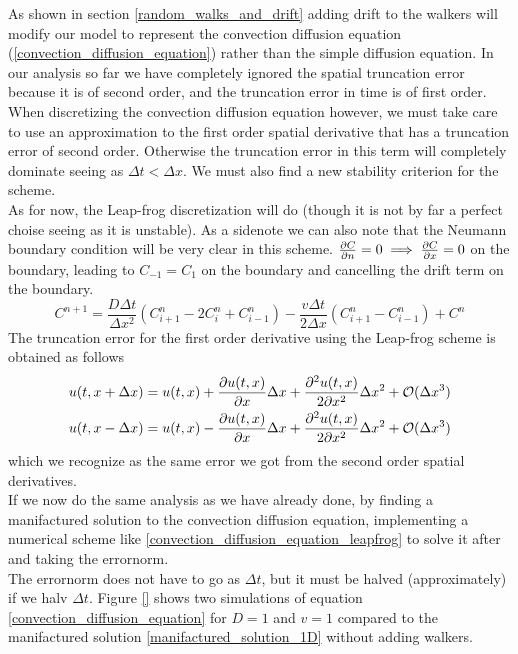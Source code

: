 As shown in section \ref{random_walks_and_drift} adding drift to the walkers will modify our model to represent the convection diffusion equation (\ref{convection_diffusion_equation}) rather than the simple diffusion equation. 
In our analysis so far we have completely ignored the spatial truncation error because it is of second order, and the truncation error in time is of first order. 
When discretizing the convection diffusion equation however, we must take care to use an approximation to the first order spatial derivative that has a truncation error of second order. 
Otherwise the truncation error in this term will completely dominate seeing as $\Delta t<\Delta x$. 
We must also find a new stability criterion for the scheme. \\
As for now, the Leap-frog discretization will do (though it is not by far a perfect choise seeing as it is unstable). 
As a sidenote we can also note that the Neumann boundary condition will be very clear in this scheme. 
$\frac{\partial C}{\partial n} = 0 \implies \frac{\partial C}{\partial x} = 0 $ on the boundary, leading to $C_{-1} = C_{1}$ on the boundary and cancelling the drift term on the boundary.
\begin{equation}\label{convection_diffusion_equation_leapfrog}
 C^{n+1} = \frac{D\Delta t}{\Delta x^2}\left(C^n_{i+1}-2C^n_i+C^n_{i-1}\right)-\frac{v\Delta t}{2\Delta x}\left(C^n_{i+1}-C^n_{i-1}\right) + C^n
\end{equation}
The truncation error for the first order derivative using the Leap-frog scheme is obtained as follows
\begin{align*}
 u(t,x+\Delta x) = u(t,x) + \frac{\partial u(t,x)}{\partial x}\Delta x + \frac{\partial^2u(t,x)}{2\partial x^2}\Delta x^2 +\mathcal{O}(\Delta x^3)\\
 u(t,x-\Delta x) = u(t,x) - \frac{\partial u(t,x)}{\partial x}\Delta x + \frac{\partial^2u(t,x)}{2\partial x^2}\Delta x^2 +\mathcal{O}(\Delta x^3)
\end{align*}
which we recognize as the same error we got from the second order spatial derivatives.\\
If we now do the same analysis as we have already done, by finding a manifactured solution to the convection diffusion equation, implementing a numerical scheme like \ref{convection_diffusion_equation_leapfrog} to solve it after and taking the errornorm. \\
The errornorm does not have to go as $\Delta t$, but it must be halved (approximately) if we halv $\Delta t$. 
Figure \ref{} shows two simulations of equation \ref{convection_diffusion_equation} for $D =1$ and $v=1$ compared to the manifactured solution \ref{manifactured_solution_1D} without adding walkers. 
